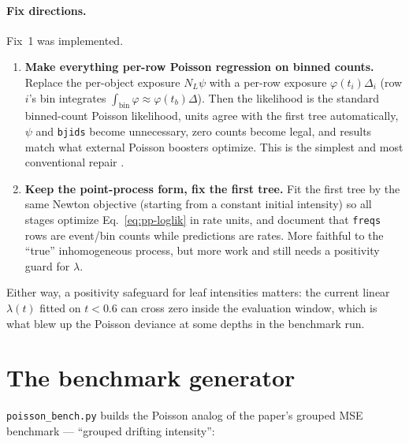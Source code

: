 \documentclass[11pt]{article}
\newcommand{\code}[1]{\texttt{\small #1}}
\begin{document}
\paragraph{Fix directions.} Fix~1 was implemented.
\begin{enumerate}
\item \textbf{Make everything per-row Poisson regression on binned counts.} Replace the
      per-object exposure $N_L\psi$ with a per-row exposure $\varphi(t_i)\Delta_i$
      (row $i$'s bin integrates $\int_{\text{bin}} \varphi \approx \varphi(t_b)\Delta$).
      Then the likelihood is the standard binned-count Poisson likelihood, units agree
      with the first tree automatically, $\psi$ and \code{bjids} become unnecessary,
      zero counts become legal, and results match what external Poisson boosters
      optimize. This is the simplest and most conventional repair
      \cite{cameron2013,ohlsson2010}.
\item \textbf{Keep the point-process form, fix the first tree.} Fit the first tree by
      the same Newton objective (starting from a constant initial intensity) so all
      stages optimize Eq.~\eqref{eq:pp-loglik} in rate units, and document that
      \code{freqs} rows are event/bin counts while predictions are rates. More faithful
      to the ``true'' inhomogeneous process, but more work and still needs a
      positivity guard for $\lambda$.
\end{enumerate}
Either way, a positivity safeguard for leaf intensities matters: the current linear
$\lambda(t)$ fitted on $t < 0.6$ can cross zero inside the evaluation window, which is
what blew up the Poisson deviance at some depths in the benchmark run.

\section{The benchmark generator}

\code{poisson\_bench.py} builds the Poisson analog of the paper's grouped MSE benchmark
--- ``grouped drifting intensity'':
\end{document}
